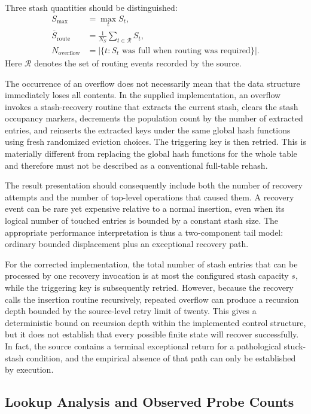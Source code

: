 \documentclass[conference]{IEEEtran}
\begin{document}
Three stash quantities should be distinguished:
\begin{align}
S_{\max} &= \max_t S_t,\\
\overline{S}_{\mathrm{route}} &= \frac{1}{N_S}
\sum_{t\in\mathcal{R}} S_t,\\
N_{\mathrm{overflow}} &= |\{t:S_t\text{ was full when routing was required}\}|.
\end{align}
Here $\mathcal{R}$ denotes the set of routing events recorded by the source.

The occurrence of an overflow does not necessarily mean that the data structure immediately loses all contents. In the supplied implementation, an overflow invokes a stash-recovery routine that extracts the current stash, clears the stash occupancy markers, decrements the population count by the number of extracted entries, and reinserts the extracted keys under the same global hash functions using fresh randomized eviction choices. The triggering key is then retried. This is materially different from replacing the global hash functions for the whole table and therefore must not be described as a conventional full-table rehash.

The result presentation should consequently include both the number of recovery attempts and the number of top-level operations that caused them. A recovery event can be rare yet expensive relative to a normal insertion, even when its logical number of touched entries is bounded by a constant stash size. The appropriate performance interpretation is thus a two-component tail model: ordinary bounded displacement plus an exceptional recovery path.

For the corrected implementation, the total number of stash entries that can be processed by one recovery invocation is at most the configured stash capacity $s$, while the triggering key is subsequently retried. However, because the recovery calls the insertion routine recursively, repeated overflow can produce a recursion depth bounded by the source-level retry limit of twenty. This gives a deterministic bound on recursion depth within the implemented control structure, but it does not establish that every possible finite state will recover successfully. In fact, the source contains a terminal exceptional return for a pathological stuck-stash condition, and the empirical absence of that path can only be established by execution.

\subsection{Lookup Analysis and Observed Probe Counts}
\label{subsec:lookup_results}
\end{document}
